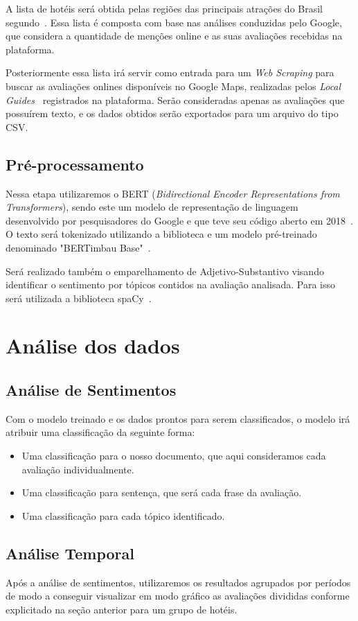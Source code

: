 A lista de hotéis será obtida pelas regiões das principais atrações do Brasil segundo~\cite{googleFlights2022destinos}. Essa lista é composta com base nas análises conduzidas pelo Google, que considera a quantidade de menções online e as suas avaliações recebidas na plataforma.

Posteriormente essa lista irá servir como entrada para um \emph{Web Scraping} para buscar as avaliações onlines disponíveis no Google Maps, realizadas pelos \emph{Local Guides}~\cite{google2022localguides} registrados na plataforma. Serão consideradas apenas as avaliações que possuírem texto, e os dados obtidos serão exportados para um arquivo do tipo CSV.


\subsection{Pré-processamento}
\label{subsec:pre_processamento}


Nessa etapa utilizaremos o BERT (\emph{Bidirectional Encoder Representations from Transformers}), sendo este um modelo de representação de linguagem desenvolvido por pesquisadores do Google e que teve seu código aberto em 2018~\cite{hugoZanini2021mediu}. O texto será tokenizado utilizando a biblioteca e um modelo pré-treinado denominado "BERTimbau Base"~\cite{souza2020bertimbau}.

Será realizado também o emparelhamento de Adjetivo-Substantivo visando identificar o sentimento por tópicos contidos na avaliação analisada. Para isso será utilizada a biblioteca spaCy~\cite{montani2022spacy}. 

\section{Análise dos dados}

\subsection{Análise de Sentimentos}
\label{subsec:analise_sentimentos}

Com o modelo treinado e os dados prontos para serem classificados, o modelo irá atribuir uma classificação da seguinte forma:
\begin{itemize}
    \item Uma classificação para o nosso documento, que aqui consideramos cada avaliação individualmente.
    \item Uma classificação para sentença, que será cada frase da  avaliação.
    \item Uma classificação para cada tópico identificado.
\end{itemize}

\subsection{Análise Temporal}
\label{subsec:analise_temporal}
Após a análise de sentimentos, utilizaremos os resultados agrupados por períodos de modo a conseguir visualizar em modo gráfico as avaliações divididas conforme explicitado na seção anterior para um grupo de hotéis.
